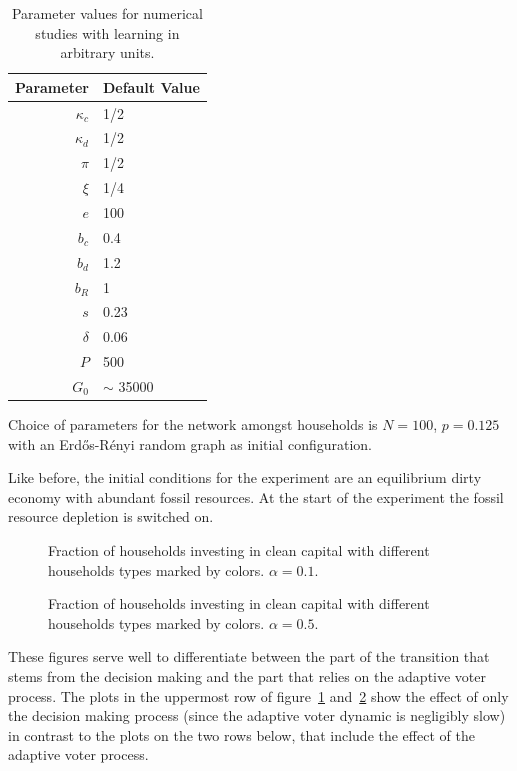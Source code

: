 \begin{table}[t] 
	\centering
	\begin{tabular}{r|l}
		Parameter & Default Value \\\hline
		$\kappa_c$ & 1/2 \\
		$\kappa_d$ & 1/2 \\
		$\pi$ & 1/2 \\
		$\xi$ & 1/4 \\
		$e$ & 100 \\
		$b_c$ & 0.4 \\
		$b_d$ & 1.2 \\
		$b_R$ & 1 \\
		$s$ & 0.23 \\
		$\delta $ & 0.06 \\
		$P$ & 500 \\
		$G_0$ & $\sim$ 35000 \\
	\end{tabular}
	\caption{Parameter values for numerical studies with learning in arbitrary units.}
	\label{tab:learning_parameter_values}
\end{table}

Choice of parameters for the network amongst households is $N=100$, $p=0.125$ with an Erd\H{o}s-R\'enyi random graph as initial configuration. 

Like before, the initial conditions for the experiment are an equilibrium dirty economy with abundant fossil resources. At the start of the experiment the fossil resource depletion is switched on.\

\begin{figure}[t]
	\centering
	\caption{Fraction of households investing in clean capital with different households types marked by colors. $\alpha=0.1$.}
	\label{fig:learning_decisions0o1}
\end{figure}

\begin{figure}[t]
	\centering
	\caption{Fraction of households investing in clean capital with different households types marked by colors. $\alpha=0.5$.}
	\label{fig:learning_decisions0o05}
\end{figure}
These figures serve well to differentiate between the part of the transition that stems from the decision making and the part that relies on the adaptive voter process.
The plots in the uppermost row of figure~\ref{fig:learning_decisions0o1} and~\ref{fig:learning_decisions0o05} show the effect of only the decision making process (since the adaptive voter dynamic is negligibly slow) in contrast to the plots on the two rows below, that include the effect of the adaptive voter process.\\

